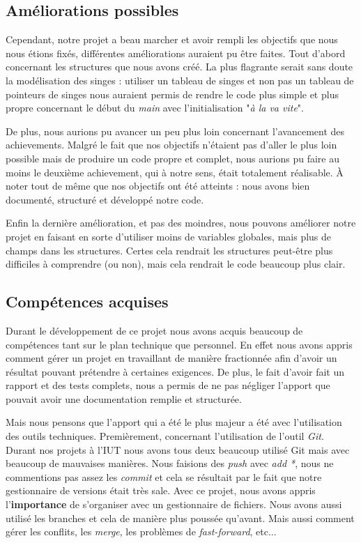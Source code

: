 \documentclass{article}
\begin{document}

\subsection{Améliorations possibles}
\label{subsct:ame_possibles}

Cependant, notre projet a beau marcher et avoir rempli les objectifs que nous nous étions fixés, différentes améliorations auraient pu être faites. Tout d'abord concernant les structures que nous avons créé. La plus flagrante serait sans doute la modélisation des singes : utiliser un tableau de singes et non pas un tableau de pointeurs de singes nous auraient permis de rendre le code plus simple et plus propre concernant le début du \textit{main} avec l'initialisation "\textit{à la va vite}".

De plus, nous aurions pu avancer un peu plus loin concernant l'avancement des achievements. Malgré le fait que nos objectifs n'étaient pas d'aller le plus loin possible mais de produire un code propre et complet, nous aurions pu faire au moins le deuxième achievement, qui à notre sens, était totalement réalisable. À noter tout de même que nos objectifs ont été atteints : nous avons bien documenté, structuré et développé notre code.

Enfin la dernière amélioration, et pas des moindres, nous pouvons améliorer notre projet en faisant en sorte d'utiliser moins de variables globales, mais plus de champs dans les structures. Certes cela rendrait les structures peut-être plus difficiles à comprendre (ou non), mais cela rendrait le code beaucoup plus clair.


\subsection{Compétences acquises}
\label{subsct:competences_acquises}

Durant le développement de ce projet nous avons acquis beaucoup de compétences tant sur le plan technique que personnel. En effet nous avons appris comment gérer un projet en travaillant de manière fractionnée afin d'avoir un résultat pouvant prétendre à certaines exigences. De plus, le fait d'avoir fait un rapport et des tests complets, nous a permis de ne pas négliger l'apport que pouvait avoir une documentation remplie et structurée.

Mais nous pensons que l'apport qui a été le plus majeur a été avec l'utilisation des outils techniques. Premièrement, concernant l'utilisation de l'outil \textit{Git}. Durant nos projets à l'IUT nous avons tous deux beaucoup utilisé Git mais avec beaucoup de mauvaises manières. Nous faisions des \textit{push} avec \textit{add *}, nous ne commentions pas assez les \textit{commit} et cela se résultait par le fait que notre gestionnaire de versions était très sale. Avec ce projet, nous avons appris l'\textbf{importance} de s'organiser avec un gestionnaire de fichiers. Nous avons aussi utilisé les branches et cela de manière plus poussée qu'avant. Mais aussi comment gérer les conflits, les \textit{merge}, les problèmes de \textit{fast-forward}, etc...
\end{document}
